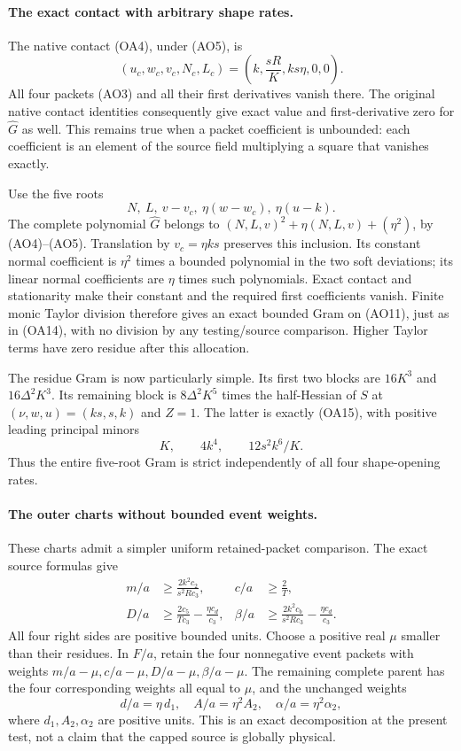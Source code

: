 \paragraph{The exact contact with arbitrary shape rates.}
The native contact (OA4), under (AO5), is
\[
 (u_c,w_c,v_c,N_c,L_c)
       =\left(k,\frac{sR}{K},ks\eta,0,0\right).        \tag{AO10}
\]
All four packets (AO3) and all their first derivatives vanish there.
The original native contact identities consequently give exact value
and first-derivative zero for $\widehat G$ as well. This remains true
when a packet coefficient is unbounded: each coefficient is an element
of the source field multiplying a square that vanishes exactly.

Use the five roots
\[
       N,\ L,\ v-v_c,\ \eta(w-w_c),\ \eta(u-k).       \tag{AO11}
\]
The complete polynomial $\widehat G$ belongs to
$(N,L,v)^2+\eta(N,L,v)+(\eta^2)$, by (AO4)--(AO5).
Translation by $v_c=\eta ks$ preserves this inclusion. Its constant
normal coefficient is $\eta^2$ times a bounded polynomial in the
two soft deviations; its linear normal coefficients are $\eta$ times
such polynomials. Exact contact and stationarity make their constant
and the required first coefficients vanish. Finite monic Taylor
division therefore gives an exact bounded Gram on (AO11), just as in
(OA14), with no division by any testing/source comparison.
Higher Taylor terms have zero residue after this allocation.

The residue Gram is now particularly simple. Its first two blocks are
$16K^3$ and $16\Delta^2K^3$. Its remaining block is
$8\Delta^2K^5$ times the half-Hessian of $S$ at
$(\nu,w,u)=(ks,s,k)$ and $Z=1$. The latter is exactly (OA15), with
positive leading principal minors
\[
                         K,\qquad4k^4,\qquad12s^2k^6/K.
\]
Thus the entire five-root Gram is strict independently of all four
shape-opening rates.

\paragraph{The outer charts without bounded event weights.}
These charts admit a simpler uniform retained-packet comparison.
The exact source formulas give
\begin{align*}
 m/a&\ge\frac{2k^2c_2}{s^2Rc_3},&
 c/a&\ge\frac2T,\\
 D/a&\ge\frac{2c_5}{Tc_3}-\frac{\eta c_d}{c_3},&
 \beta/a&\ge\frac{2k^2c_b}{s^2Rc_3}-\frac{\eta c_d}{c_3}.
                                                               \tag{AO12}
\end{align*}
All four right sides are positive bounded units. Choose a positive
real $\mu$ smaller than their residues. In $F/a$, retain the four
nonnegative event packets with weights
$m/a-\mu,c/a-\mu,D/a-\mu,\beta/a-\mu$. The remaining complete
parent has the four corresponding weights all equal to $\mu$,
and the unchanged weights
\[
 d/a=\eta\,d_1,\quad A/a=\eta^2A_2,\quad
 \alpha/a=\eta^2\alpha_2,
\]
where $d_1,A_2,\alpha_2$ are positive units. This is an exact
decomposition at the present test, not a claim that the capped source
is globally physical.

